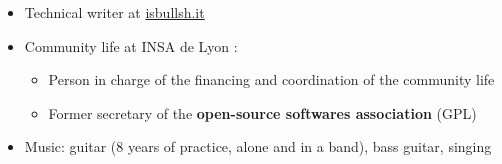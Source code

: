 \begin{itemize}
\renewcommand{\labelitemi}{$\circ$}
	\item Technical writer at \href{http://isbullsh.it}{isbullsh.it}
	\item Community life at INSA de Lyon :
	\begin{itemize}
		\item Person in charge of the financing and coordination of the community life
		\item Former secretary of the \textbf{open-source softwares association} (GPL) 
	\end{itemize}
    \item Music: guitar (8 years of practice, alone and in a band), bass guitar, singing    
\end{itemize}

